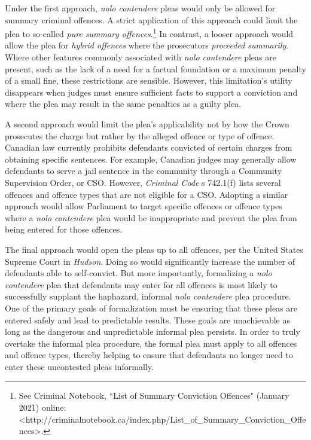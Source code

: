 Under the first approach, \textit{nolo contendere} pleas would only be allowed for summary criminal offences. A strict application of this approach could limit the plea to so-called \textit{pure summary offences}.\footnote{See Criminal Notebook, ``List of Summary Conviction Offences" (January 2021) online: \textless http://criminalnotebook.ca/index.php/List\_of\_Summary\_Conviction\_Offences\textgreater.} In contrast, a looser approach would allow the plea for \textit{hybrid offences} where the prosecutors \textit{proceeded summarily}. Where other features commonly associated with \textit{nolo contendere} pleas are present, such as the lack of a need for a factual foundation or a maximum penalty of a small fine, these restrictions are sensible. However, this limitation's utility disappears when judges must ensure sufficient facts to support a conviction and where the plea may result in the same penalties as a guilty plea. 

A second approach would limit the plea's applicability not by how the Crown prosecutes the charge but rather by the alleged offence or type of offence. Canadian law currently prohibits defendants convicted of certain charges from obtaining specific sentences. For example, Canadian judges may generally allow defendants to serve a jail sentence in the community through a Community Supervision Order, or CSO. However, \textit{Criminal Code} s 742.1(f) lists several offences and offence types that are not eligible for a CSO. Adopting a similar approach would allow Parliament to target specific offences or offence types where a \textit{nolo contendere} plea would be inappropriate and prevent the plea from being entered for those offences.

The final approach would open the pleas up to all offences, per the United States Supreme Court in \textit{Hudson}. Doing so would significantly increase the number of defendants able to self-convict. But more importantly, formalizing a \textit{nolo contendere} plea that defendants may enter for all offences is most likely to successfully supplant the haphazard, informal \textit{nolo contendere} plea procedure. One of the primary goals of formalization must be ensuring that these pleas are entered safely and lead to predictable results. These goals are unachievable as long as the dangerous and unpredictable informal plea persists. In order to truly overtake the informal plea procedure, the formal plea must apply to all offences and offence types, thereby helping to ensure that defendants no longer need to enter these uncontested pleas informally.

